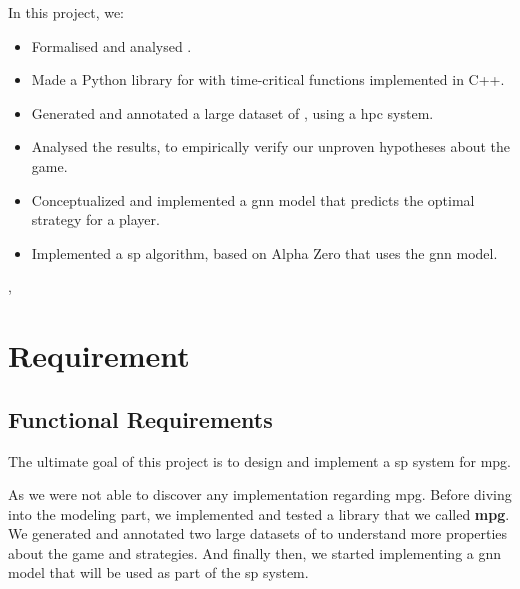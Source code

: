 In this project, we:
\begin{itemize}
	\item Formalised and analysed  .
	\item Made a Python library for  with time-critical functions implemented in C++.
	\item Generated and annotated a large dataset of , using a \acrfull{hpc} system.
	\item Analysed the results, to empirically verify our unproven hypotheses about the game.
	\item Conceptualized and implemented a \acrfull{gnn} model that predicts the optimal strategy for a player.
	\item Implemented a \acrfull{sp} algorithm, based on Alpha Zero \cite{AlphaZero} that uses the \acrshort{gnn} model. 
\end{itemize}, 
\section{Requirement}
\subsection{Functional Requirements}
The ultimate goal of this project is to design and implement a \acrshort{sp} system for \acrshort{mpg}. 

As we were not able to discover any implementation regarding \acrshort{mpg}. Before diving into the modeling part, we implemented and tested a library that we called \textbf{\acrshort{mpg}}. We generated and annotated two large datasets of  to understand more properties about the game and strategies. And finally then, we started implementing a \acrshort{gnn} model that will be used as part of the \acrshort{sp} system.

